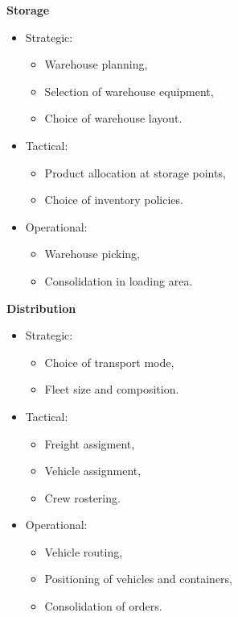 \documentclass[english]{panikzettel}
\begin{document}
\begin{halfboxl}
    \small{}
    \textbf{Storage}
    \begin{itemize}
        \item Strategic:
            \begin{itemize}
                \item Warehouse planning,
                \item Selection of warehouse equipment,
                \item Choice of warehouse layout.
            \end{itemize}
        \item Tactical:
            \begin{itemize}
                \item Product allocation at storage points,
                \item Choice of inventory policies.
            \end{itemize}
        \item Operational:
            \begin{itemize}
                \item Warehouse picking,
                \item Consolidation in loading area.
            \end{itemize}
    \end{itemize}
\end{halfboxl}%
\begin{halfboxr}
    \vspace{-\baselineskip}
    \small{}
    \textbf{Distribution}
    \begin{itemize}
        \item Strategic:
            \begin{itemize}
                \item Choice of transport mode,
                \item Fleet size and composition.
            \end{itemize}
        \item Tactical:
            \begin{itemize}
                \item Freight assigment,
                \item Vehicle assignment,
                \item Crew rostering.
            \end{itemize}
        \item Operational:
            \begin{itemize}
                \item Vehicle routing,
                \item Positioning of vehicles and containers,
                \item Consolidation of orders.
            \end{itemize}
    \end{itemize}
\end{halfboxr}
\end{document}
